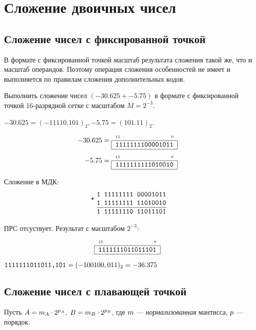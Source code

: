 \chapter{Сложение двоичных чисел}
\label{ch:binadd}


\section{Сложение чисел с фиксированной точкой}

В формате с фиксированной точкой масштаб результата сложения такой же, что и масштаб операндов. Поэтому операция сложения особенностей не имеет и выполняется по правилам сложения дополнительных кодов.

\begin{Example}
    Выполнить сложение чисел $({-30.625}+{-5.75})$ в формате с фиксированной точкой 16-разрядной сетке с масштабом $M=2^{-3}$.
\end{Example}
\begin{Solve}
    ${-30.625} = (-11110.101)_2, {-5.75} = (101.11)_2$.
    \begin{align*}
        -30.625=\UnsignedTwoBytes{1111111100001011}\\
        -5.75  =\UnsignedTwoBytes{1111111111010010}\\
    \end{align*}
    
    Сложение в МДК:
    \[
        \Addition{1 11111111 00001011}
                 {1 11111111 11010010}
                 {1 11111110 11011101}
    \]
    
    ПРС отсуствует. Результат с масштабом $2^{-3}$:
    \[
        \UnsignedTwoBytes{1111111011011101}
    \]
    
    $\texttt{1111111011011,101}=(-100100,011)_2=-36.375$
\end{Solve}



\section{Сложение чисел с плавающей точкой}


Пусть $A=m_{A}\cdot {2}^{p_{A}}$, $B=m_{B}\cdot {2}^{p_{B}}$, где $m$ --- \emph{нормализованная} мантисса, $p$ --- порядок.

